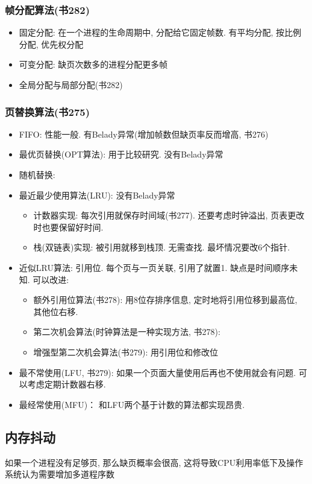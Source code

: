\documentclass[a4paper, UTF8]{article}
\begin{document}
\subsubsection{帧分配算法(书282)}
\begin{itemize}
\item 固定分配: 在一个进程的生命周期中, 分配给它固定帧数. 有平均分配, 按比例分配, 优先权分配
\item 可变分配: 缺页次数多的进程分配更多帧
\item 全局分配与局部分配(书282)
\end{itemize}
\subsubsection{页替换算法(书275)}
\begin{itemize}
\item FIFO: 性能一般. 有Belady异常(增加帧数但缺页率反而增高, 书276)
\item 最优页替换(OPT算法): 用于比较研究. 没有Belady异常
\item 随机替换: 
\item 最近最少使用算法(LRU): 没有Belady异常
	\begin{itemize}
	\item 计数器实现: 每次引用就保存时间域(书277). 还要考虑时钟溢出, 页表更改时也要保留好时间.
	\item 栈(双链表)实现: 被引用就移到栈顶. 无需查找. 最坏情况要改6个指针.
	\end{itemize}
\item 近似LRU算法: 引用位. 每个页与一页关联, 引用了就置1. 缺点是时间顺序未知. 可以改进:
	\begin{itemize}
	\item 额外引用位算法(书278): 用8位存排序信息, 定时地将引用位移到最高位, 其他位右移.
	\item 第二次机会算法(时钟算法是一种实现方法, 书278): 
	\item 增强型第二次机会算法(书279): 用引用位和修改位
	\end{itemize}
\item 最不常使用(LFU, 书279): 如果一个页面大量使用后再也不使用就会有问题. 可以考虑定期计数器右移.
\item 最经常使用(MFU)： 和LFU两个基于计数的算法都实现昂贵.

\end{itemize}

\subsection{内存抖动}
如果一个进程没有足够页, 那么缺页概率会很高, 这将导致CPU利用率低下及操作系统认为需要增加多道程序数
\end{document}
